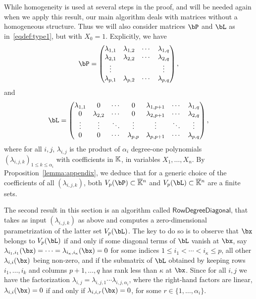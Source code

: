 \documentclass[12pt]{article}
\begin{document}
While homogeneity is used at several steps in the proof, and will be
needed again when we apply this result, our main algorithm deals with
matrices without a homogeneous structure. Thus we will also consider 
matrices $\bP$ and $\bL$ as in~\eqref{eqdef:type1}, but with $X_0=1$. Explicitly,
we have
\begin{align}\label{eqdef:type2aff}
  \bP= \left( \begin{matrix}
    \lambda_{1,1} & \lambda_{1,2} & \cdots & \lambda_{1, q}\\
    \lambda_{2,1} &  \lambda_{2,2} & \cdots & \lambda_{2, q}\\
    \vdots & & & \vdots\\
    \lambda_{p,1} &  \lambda_{p,2}& \cdots & \lambda_{p, q}
  \end{matrix} \right),
\end{align}
and
\begin{align}\label{eqdef:type1aff}
\bL= \left( \begin{matrix}
\lambda_{1,1} & 0 & \cdots & 0 & \lambda_{1,p+1} & \cdots & \lambda_{1, q}\\
0 & \lambda_{2,2} & \cdots & 0 & \lambda_{2,p+1} & \cdots & \lambda_{2, q}\\
\vdots & \vdots & \ddots & \vdots & \vdots & \ddots & \vdots\\
0 & 0 & \cdots & \lambda_{p,p} & \lambda_{p,p+1} & \cdots & \lambda_{p, q}
\end{matrix} \right),
\end{align}
where for all $i,j$, $\lambda_{i,j}$ is the product of $\alpha_i$
degree-one polynomials $(\lambda_{i,j,k})_{1 \le k \le \alpha_i}$ with
coefficients in $\mathbb{K}$, in variables $X_1,\dots,X_n$. By
Proposition~\ref{lemma:appendix}, we deduce that for a generic choice
of the coefficients of all $(\lambda_{i,j,k})$, both $V_p(\bP) \subset
\KKbar{}^n$ and $V_p(\bL) \subset \KKbar{}^n$ are a finite sets.

The second result in this section is an algorithm called
$\mathsf{RowDegreeDiagonal}$, that takes as input 
$(\lambda_{i,j,k})$ as above and computes a zero-dimensional parametrization of
the latter set $V_p(\bL)$. The key to do so is to observe that $\bx$
belongs to $V_p(\bL)$ if and only if some diagonal terms of $\bL$
vanish at $\bx$, say
$\lambda_{i_1,i_1}(\bx)=\cdots=\lambda_{i_\kappa,i_\kappa}(\bx)=0$ for
some indices $1 \le i_1 < \cdots < i_\kappa \le p$, all other
$\lambda_{i,i}(\bx)$ being non-zero, and if the submatrix of $\bL$
obtained by keeping rows $i_1,\dots,i_k$ and columns $p+1,\dots,q$ has
rank less than $\kappa$ at $\bx$. Since for all $i,j$ we have the
factorization
$\lambda_{i,j}=\lambda_{i,j,1}\cdots\lambda_{i,j,\alpha_i}$, where the
right-hand factors are linear, $\lambda_{i,i}(\bx)=0$ if and only if
$\lambda_{i,i,r}(\bx)=0$, for some $r \in \{1,\dots,\alpha_i\}$.
\end{document}

